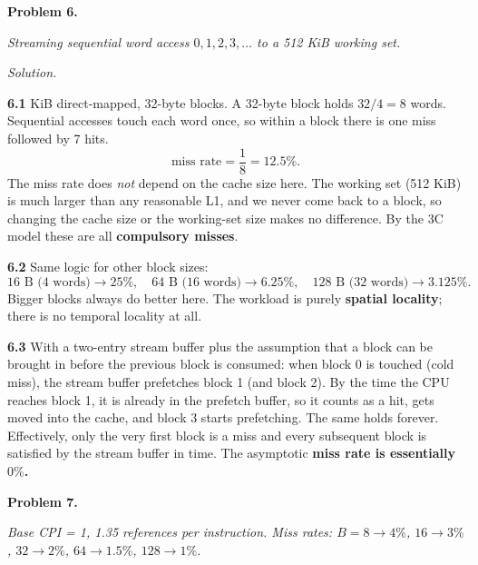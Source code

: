 \documentclass[12pt]{article}
\newcommand{\problem}[1]{\vspace{0.8em}\noindent\textbf{Problem #1.}\vspace{0.35em}}
\newenvironment{solution}{\par\noindent\textit{Solution.}\ }{\par\vspace{1.1em}}
\newcommand{\subproblem}[1]{\par\vspace{0.45em}\noindent\textbf{#1}\quad}
\newcommand{\assigntext}[1]{\par\vspace{0.25em}\small\textit{#1}\par\vspace{0.35em}}
\begin{document}
\problem{6}
\assigntext{Streaming sequential word access $0,1,2,3,\ldots$ to a 512 KiB working set.}

\begin{solution}
\subproblem{6.1} 64 KiB direct-mapped, 32-byte blocks. A 32-byte block holds $32/4 = 8$ words. Sequential accesses touch each word once, so within a block there is one miss followed by 7 hits.
\[
\text{miss rate} = \frac{1}{8} = 12.5\%.
\]
The miss rate does \emph{not} depend on the cache size here. The working set (512 KiB) is much larger than any reasonable L1, and we never come back to a block, so changing the cache size or the working-set size makes no difference. By the 3C model these are all \textbf{compulsory misses}.

\subproblem{6.2} Same logic for other block sizes:
\[
\text{16 B (4 words)} \to 25\%,\quad \text{64 B (16 words)} \to 6.25\%,\quad \text{128 B (32 words)} \to 3.125\%.
\]
Bigger blocks always do better here. The workload is purely \textbf{spatial locality}; there is no temporal locality at all.

\subproblem{6.3} With a two-entry stream buffer plus the assumption that a block can be brought in before the previous block is consumed: when block 0 is touched (cold miss), the stream buffer prefetches block 1 (and block 2). By the time the CPU reaches block 1, it is already in the prefetch buffer, so it counts as a hit, gets moved into the cache, and block 3 starts prefetching. The same holds forever. Effectively, only the very first block is a miss and every subsequent block is satisfied by the stream buffer in time. The asymptotic \textbf{miss rate is essentially $0\%$.}
\end{solution}

\problem{7}
\assigntext{Base CPI = 1, 1.35 references per instruction. Miss rates: $B{=}8\to4\%$, $16\to3\%$, $32\to2\%$, $64\to1.5\%$, $128\to1\%$.}
\end{document}
